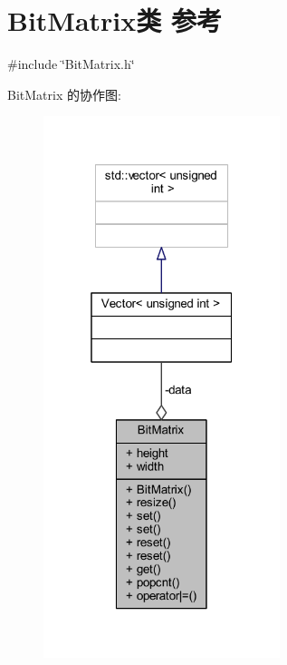 \hypertarget{classBitMatrix}{}\section{Bit\+Matrix类 参考}
\label{classBitMatrix}


{\ttfamily \#include \char`\"{}Bit\+Matrix.\+h\char`\"{}}



Bit\+Matrix 的协作图\+:
\nopagebreak
\begin{figure}[H]
\begin{center}
\leavevmode
\includegraphics[width=196pt]{classBitMatrix__coll__graph}
\end{center}
\end{figure}

